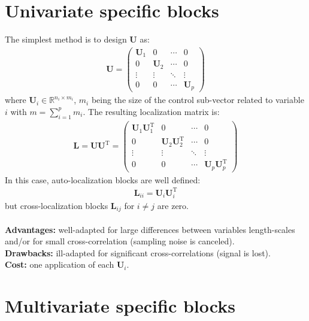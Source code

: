 \documentclass[12pt]{scrartcl}
\begin{document}
\section{Univariate specific blocks}
The simplest method is to design $\mathbf{U}$ as:
\begin{align}
\mathbf{U} = \left( \begin{array}{cccc}
\mathbf{U}_1 & 0 & \cdots & 0 \\
0 & \mathbf{U}_2 & \cdots & 0 \\
\vdots & \vdots & \ddots & \vdots \\
0 & 0 & \cdots & \mathbf{U}_p
\end{array} \right)
\end{align}
where $\mathbf{U}_i \in \mathbb{R}^{n_i \times m_i}$, $m_i$ being the size of the control sub-vector related to variable $i$ with $\displaystyle m = \sum_{i=1}^p m_i$. The resulting localization matrix is:
\begin{align}
\mathbf{L} = \mathbf{U} \mathbf{U}^\mathrm{T} = \left( \begin{array}{cccc}
\mathbf{U}_1 \mathbf{U}_1^\mathrm{T} & 0 & \cdots & 0 \\
0 & \mathbf{U}_2 \mathbf{U}_2^\mathrm{T} & \cdots & 0 \\
\vdots & \vdots & \ddots & \vdots \\
0 & 0 & \cdots & \mathbf{U}_p \mathbf{U}_p^\mathrm{T} 
\end{array} \right)
\end{align}
In this case, auto-localization blocks are well defined:
\begin{align}
\mathbf{L}_{ii} = \mathbf{U}_i \mathbf{U}_i^\mathrm{T}
\end{align}
but cross-localization blocks $\mathbf{L}_{ij}$ for $i \ne j$ are zero.\\
$  $\\
\textbf{Advantages:} well-adapted for large differences between variables length-scales and/or for small cross-correlation (sampling noise is canceled).\\
\textbf{Drawbacks:} ill-adapted for significant cross-correlations (signal is lost).\\
\textbf{Cost:} one application of each $\mathbf{U}_i$.

\section{Multivariate specific blocks}
\end{document}
